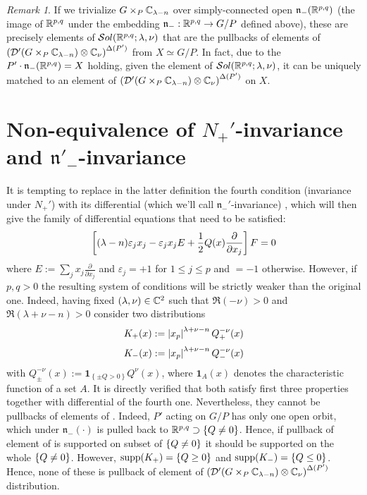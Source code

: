 \documentclass[10pt]{article} %
\newcommand{\D}{\mathcal{D}}
\theoremstyle{definition}
\theoremstyle{remark}
\newtheorem*{remark}{Remark}
\begin{document}
\begin{remark}
	If we trivialize $G\times_P\C_{\lambda-n}$ over simply-connected open $\mathfrak{n}_-(\R^{p,q})$ (the image of $\R^{p,q}$
	under the embedding $\mathfrak{n}_-:\R^{p,q}\to G/P$ defined above),
	these are precisely elements of $\sol[\R^{p,q}]$
	that are the pullbacks of elements of 
	$\mybra{\D'(G\times_P\C_{\lambda-n})\otimes\C_\nu}^{\Delta(P')}$
	from $X\simeq G/P$.
	In fact, due to the $P'\cdot\mathfrak{n}_-(\R^{ p,q })=X$ holding, given the element of $\sol[\R^{p,q}]$,
	it can be uniquely matched to an element of
	$\mybra{\D'(G\times_P\C_{\lambda-n} )\otimes\C_\nu}^{\Delta(P')}$
	on $X$.
\end{remark}
\section{Non-equivalence of $N_+'$-invariance and $\mathfrak{n}'_-$-invariance}
It is tempting to replace in the latter definition
the fourth condition (invariance under $N_+'$) with its differential (which we'll call $\mathfrak{n}_-'$-invariance)
, which will then give the family of differential equations that need to be satisfied:
\begin{equation}
\mysbra{(\lambda-n)\varepsilon_jx_j-\varepsilon_jx_jE+\frac{ 1 }{ 2 }Q(x)\frac{ \partial}{ \partial x_j } }F=0
	\label{Ndiff}
\end{equation}
where $E:=\sum_j x_j\frac{ \partial }{ \partial x_j }$ and $\varepsilon_j=+1$ for $1\leq j\leq p$ and $=-1$ otherwise.
However, if $p,q>0$ the resulting system of conditions will be strictly weaker than the original one. Indeed, having
fixed $(\lambda,\nu)\in\C^2$ such that $\Re(-\nu)>0$ and $\Re(\lambda+\nu-n)>0$ consider two distributions
\[K_+(x):=\myabs{ x_p }^{ \lambda+\nu-n }Q_+^{ -\nu }(x)\]
\[K_-(x):=\myabs{ x_p }^{ \lambda+\nu-n }Q_-^{ -\nu }(x)\]
with $Q^{-\nu}_{\pm}(x):=\mathbf{1}_{\left\{ \pm Q>0 \right\}}Q^{\nu}(x)$, where $\mathbf{1}_A(x)$ denotes the
characteristic function of a set $A$.
It is directly verified that both satisfy first three properties together with differential of the fourth one. Nevertheless,
they cannot be pullbacks of elements of \sone. Indeed, $P'$ acting on $G/P$
has only one open orbit, which under $\mathfrak{n}_-(\cdot)$ is pulled back to $\R^{ p,q }\supset\mycbra{ Q\neq0 }$.
Hence, if pullback of element of \sone is supported on subset of $\mycbra{ Q\neq0 }$
it should be supported on the whole $\mycbra{ Q\neq0 }$. However, $\supp(K_+)=\mycbra{ Q\geq0 }$ and
$\supp(K_-)=\mycbra{ Q\leq0 }$. Hence, none of these is pullback of element of 
$\mybra{\D'(G\times_P\C_{\lambda-n} )\otimes\C_\nu}^{\Delta(P')}$ distribution.
\end{document}
